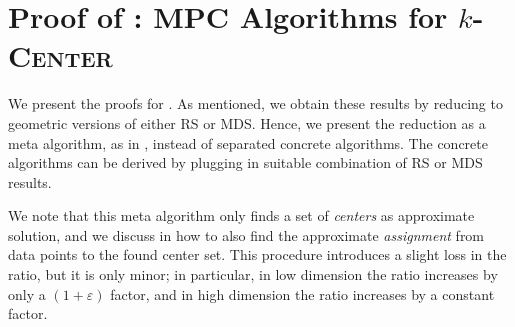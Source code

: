 \documentclass[11pt,letterpaper]{article}
\theoremstyle{plain}
\theoremstyle{definition}
\theoremstyle{remark}
\newcommand{\ProblemName}[1]{\textsc{#1}}
\newcommand{\kCenter}{$k$-\ProblemName{Center}\xspace}
\renewcommand{\epsilon}{\ensuremath{\varepsilon}}
\let\epsilon\varepsilon
\begin{document}
     \section{Proof of : MPC Algorithms for \kCenter}
\label{sec:kcenter}

We present the proofs for . 
As mentioned, we obtain these results by reducing to geometric versions of either RS or MDS.
Hence, we present the reduction as a meta algorithm, as in , instead of separated concrete algorithms.
The concrete algorithms can be derived by plugging in suitable combination of RS or MDS results.

We note that this meta algorithm only finds a set of \emph{centers} as approximate solution,
and we discuss in  how to also find the approximate \emph{assignment} from data points to the found center set.
This procedure introduces a slight loss in the ratio, but it is only minor;
in particular, in low dimension the ratio increases by only a $(1 + \epsilon)$ factor,
and in high dimension the ratio increases by a constant factor.
\end{document}
